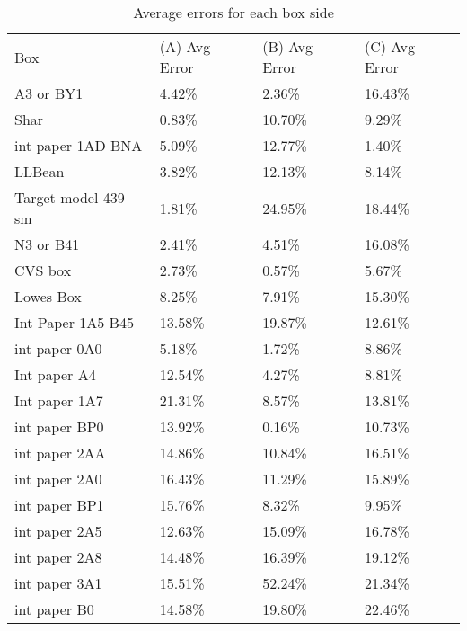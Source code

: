 \documentclass[11pt, twoside, reqno]{book}
\begin{document}
\FloatBarrier
\begin{table}[]
	\centering

	\label{AR2C}
	\begin{tabular}{llll}
		Box                 & (A) Avg Error & (B) Avg Error & (C) Avg Error \\
		A3 or BY1           & 4.42\%        & 2.36\%        & 16.43\%       \\
		Shar                & 0.83\%        & 10.70\%       & 9.29\%        \\
		int paper 1AD BNA   & 5.09\%        & 12.77\%       & 1.40\%        \\
		LLBean              & 3.82\%        & 12.13\%       & 8.14\%        \\
		Target model 439 sm & 1.81\%        & 24.95\%       & 18.44\%       \\
		N3 or B41           & 2.41\%        & 4.51\%        & 16.08\%       \\
		CVS box             & 2.73\%        & 0.57\%        & 5.67\%        \\
		Lowes Box           & 8.25\%        & 7.91\%        & 15.30\%       \\
		Int Paper 1A5 B45   & 13.58\%       & 19.87\%       & 12.61\%       \\
		int paper 0A0       & 5.18\%        & 1.72\%        & 8.86\%        \\
		Int paper A4        & 12.54\%       & 4.27\%        & 8.81\%        \\
		Int paper 1A7       & 21.31\%       & 8.57\%        & 13.81\%       \\
		int paper BP0       & 13.92\%       & 0.16\%        & 10.73\%       \\
		int paper 2AA       & 14.86\%       & 10.84\%       & 16.51\%       \\
		int paper 2A0       & 16.43\%       & 11.29\%       & 15.89\%       \\
		int paper BP1       & 15.76\%       & 8.32\%        & 9.95\%        \\
		int paper 2A5       & 12.63\%       & 15.09\%       & 16.78\%       \\
		int paper 2A8       & 14.48\%       & 16.39\%       & 19.12\%       \\
		int paper 3A1       & 15.51\%       & 52.24\%       & 21.34\%       \\
		int paper B0        & 14.58\%       & 19.80\%       & 22.46\%      
	
\end{tabular}
\caption{Average errors for each box side}
\end{table}
\end{document}
